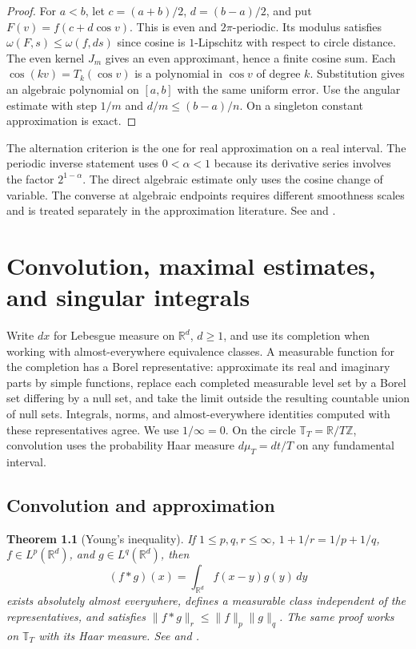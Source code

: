 \documentclass[11pt,oneside,openany]{book}
\newtheorem{theorem}{Theorem}[chapter]
\theoremstyle{definition}
\theoremstyle{remark}
\begin{document}
\begin{proof}
For $a<b$, let $c=(a+b)/2$, $d=(b-a)/2$, and put
$F(v)=f(c+d\cos v)$. This is even and $2\pi$-periodic.
Its modulus satisfies $\omega(F,s)\le\omega(f,ds)$ since
cosine is $1$-Lipschitz with respect to circle distance.
The even kernel $J_m$ gives an even approximant, hence a finite
cosine sum. Each $\cos(kv)=T_k(\cos v)$ is a polynomial in
$\cos v$ of degree $k$. Substitution gives an algebraic
polynomial on $[a,b]$ with the same uniform error. Use the
angular estimate with step $1/m$ and $d/m\le(b-a)/n$.
On a singleton constant approximation is exact.
\end{proof}

The alternation criterion is the one for real approximation on a
real interval. The periodic inverse statement uses
$0<\alpha<1$ because its derivative series involves the factor
$2^{1-\alpha}$. The direct algebraic estimate only uses the
cosine change of variable. The converse at algebraic endpoints
requires different smoothness scales and is treated separately
in the approximation literature. See \cite[Chapter~3, Sections~1--6,
Chapter~4, Section~1, and Chapters~7--8]{devore-lorentz} and
\cite[Section~3.11(i)]{dlmf}.
\chapter[Convolution and singular integrals]{Convolution, maximal estimates, and singular integrals}
\label{p102:chapter-u2}

Write \(dx\) for Lebesgue measure on \(\mathbb R^d\), \(d\geq1\), and use its completion when working with almost-everywhere equivalence classes. A measurable function for the completion has a Borel representative: approximate its real and imaginary parts by simple functions, replace each completed measurable level set by a Borel set differing by a null set, and take the limit outside the resulting countable union of null sets. Integrals, norms, and almost-everywhere identities computed with these representatives agree. We use \(1/\infty=0\). On the circle \(\mathbb T_T=\mathbb R/T\mathbb Z\), convolution uses the probability Haar measure \(d\mu_T=dt/T\) on any fundamental interval.

\section{Convolution and approximation}

\begin{theorem}[Young's inequality]
\label{p102:AN-06-C02-R01}
If \(1\le p,q,r\le\infty\), \(1+1/r=1/p+1/q\), \(f\in L^p(\mathbb R^d)\), and \(g\in L^q(\mathbb R^d)\), then
\[
(f*g)(x)=\int_{\mathbb R^d} f(x-y)g(y)\,dy
\]
exists absolutely almost everywhere, defines a measurable class independent of the representatives, and satisfies \(\|f*g\|_r\le\|f\|_p\|g\|_q\). The same proof works on \(\mathbb T_T\) with its Haar measure. See \cite[\S1.2.3]{grafakos} and \cite[\S10.5]{leoni}.
\end{theorem}
\end{document}
